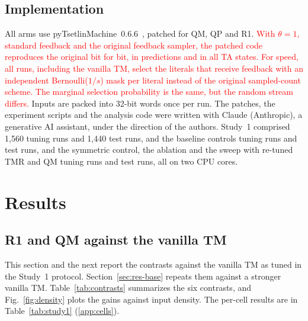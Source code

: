 \documentclass[preprint,12pt,times]{elsarticle}
\newcommand{\add}[1]{{\color{blue}#1}}
\newcommand{\maskred}[1]{\textcolor{red}{#1}}
\begin{document}
\subsection{Implementation}
All arms use pyTsetlinMachine~0.6.6~\cite{pytsetlinmachine}, patched for QM, QP and R1.
\maskred{With $\theta = 1$, standard feedback and the original feedback sampler, the patched code reproduces the original bit for bit, in predictions and in all TA states.
For speed, all runs, including the vanilla TM, select the literals that receive feedback with an independent Bernoulli($1/s$) mask per literal instead of the original sampled-count scheme. The marginal selection probability is the same, but the random stream differs.}
Inputs are packed into 32-bit words once per run.
The patches, the experiment scripts and the analysis code were written with Claude (Anthropic), a generative AI assistant, under the direction of the authors.
Study~1 comprised 1,560 tuning runs and 1,440 test runs, and the baseline controls \ctlTuneRuns{} tuning runs and \ctlTestRuns{} test runs\add{, and the symmetric control, the ablation and the sweep with re-tuned TMR and QM \fiveTuneRuns{} tuning runs and \fiveTestRuns{} test runs}, all on two CPU cores.

\section{Results}
\label{sec:results}

\subsection{R1 and QM against the vanilla TM}
\label{sec:res-main}
This section and the next report the contrasts against the vanilla TM as tuned in the Study~1 protocol. Section~\ref{sec:res-base} repeats them against a stronger vanilla TM.
Table~\ref{tab:contrasts} summarizes the six contrasts, and Fig.~\ref{fig:density} plots the gains against input density.
The per-cell results are in Table~\ref{tab:study1} (\ref{app:cells}).
\end{document}
